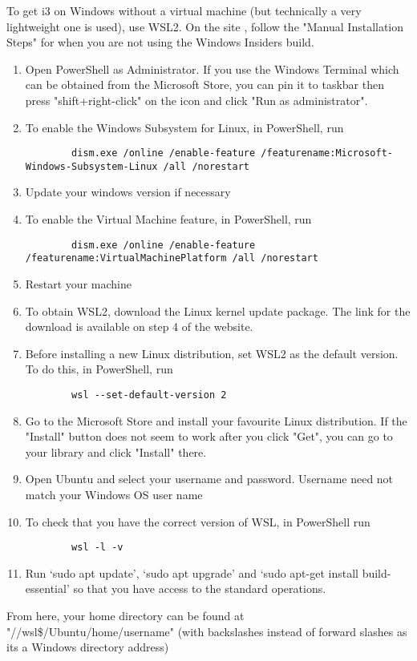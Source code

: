 To get i3 on Windows without a virtual machine (but technically a very
lightweight one is used), use WSL2. On the site \cite{microsoft2020wsl} , follow
the "Manual Installation Steps" for when you are not using the Windows Insiders
build.
\begin{enumerate}
    \item Open PowerShell as Administrator. If you use the Windows Terminal
        which can be obtained from the Microsoft Store, you can pin it to taskbar then
        press "shift+right-click" on the icon and click "Run as administrator".
    \item To enable the Windows Subsystem for Linux, in PowerShell, run
        \begin{lstlisting}
        dism.exe /online /enable-feature /featurename:Microsoft-Windows-Subsystem-Linux /all /norestart
        \end{lstlisting}
    \item Update your windows version if necessary
    \item To enable the Virtual Machine feature, in PowerShell, run
        \begin{lstlisting}
        dism.exe /online /enable-feature /featurename:VirtualMachinePlatform /all /norestart
        \end{lstlisting}
    \item Restart your machine
    \item To obtain WSL2, download the Linux kernel update package. The link for the download is
        available on step 4 of the website.
    \item Before installing a new Linux distribution, set WSL2 as the default version. To do this,
        in PowerShell, run
        \begin{lstlisting}
        wsl --set-default-version 2
        \end{lstlisting}
    \item Go to the Microsoft Store and install your favourite Linux distribution. If the "Install"
        button does not seem to work after you click "Get", you can go to your library and click
        "Install" there.
    \item Open Ubuntu and select your username and password. Username need not match your Windows
        OS user name
    \item To check that you have the correct version of WSL, in PowerShell run
        \begin{lstlisting}
        wsl -l -v
        \end{lstlisting}
    \item Run `sudo apt update', `sudo apt upgrade' and `sudo apt-get install
        build-essential' so that you have access to the standard operations.
\end{enumerate}
From here, your home directory can be found at "//wsl\$/Ubuntu/home/username"
(with backslashes instead of forward slashes as its a Windows directory address)

